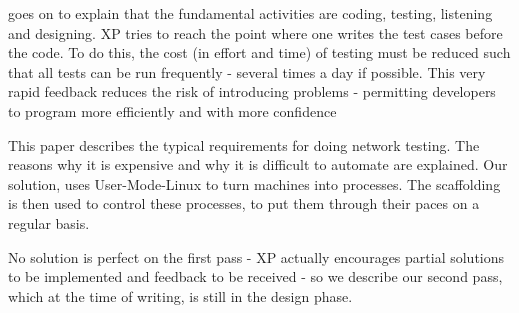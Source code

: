 \cite{XP} goes on to explain that the fundamental activities are coding,
testing, listening and designing. XP tries to reach the point where one
writes the test cases before the code. To do this, the cost (in effort and time) of
testing must be reduced such that all tests can be run frequently - several
times a day if possible. This very rapid feedback reduces the risk of
introducing problems - permitting developers to program more efficiently and
with more confidence 

This paper describes the typical requirements for doing network testing. The
reasons why it is expensive and why it is difficult to automate are
explained. 
Our solution, uses User-Mode-Linux to turn machines into processes. The
scaffolding is then used to control these processes, to put them through
their paces on a regular basis.

No solution is perfect on the first pass - XP actually encourages partial
solutions to be implemented and feedback to be received - so we describe our
second pass, which at the time of writing, is still in the design phase.






